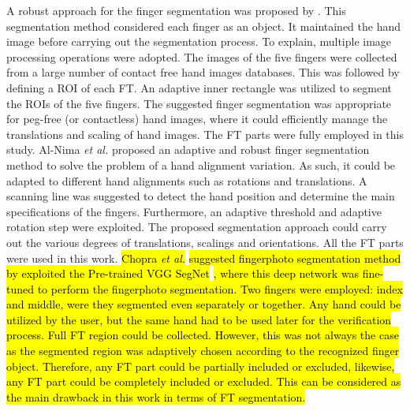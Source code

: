 \documentclass[review]{elsarticle}
\begin{document}
	A robust approach for the finger segmentation was proposed by \cite{Al-Nima2017Robust}. This segmentation method considered each finger as an object. It maintained the hand image before carrying out the segmentation process. To explain, multiple image processing operations were adopted. The images of the five fingers were collected from a large number of contact free hand images databases. This was followed by defining a ROI of each FT. An adaptive inner rectangle was utilized to segment the ROIs of the five fingers. The suggested finger segmentation was appropriate for peg-free (or contactless) hand images, where it could efficiently manage the translations and scaling of hand images. The FT parts were fully employed in this study. Al-Nima \textit{et al.} \cite{Al-Nima2017efficient} proposed an adaptive and robust finger segmentation method to solve the problem of a hand alignment variation. As such, it could be adapted to different hand alignments such as rotations and translations. A scanning line was suggested to detect the hand position and determine the main specifications of the fingers. Furthermore, an adaptive threshold and adaptive rotation step were exploited. The proposed segmentation approach could carry out the various degrees of translations, scalings and orientations. All the FT parts were used in this work. \hl{Chopra \textit{et al.}} \cite{Chopra2018Unconstrained} \hl{suggested fingerphoto segmentation method by exploited the Pre-trained VGG SegNet} \cite{Badrinarayanan2017SegNet}\hl{, where this deep network was fine-tuned to perform the fingerphoto segmentation. Two fingers were employed: index and middle, were they segmented even separately or together. Any hand could be utilized by the user, but the same hand had to be used later for the verification process. Full FT region could be collected. However, this was not always the case as the segmented region was adaptively chosen according to the recognized finger object. Therefore, any FT part could be partially included or excluded, likewise, any FT part could be completely included or excluded. This can be considered as the main drawback in this work in terms of FT segmentation. }
\end{document}
